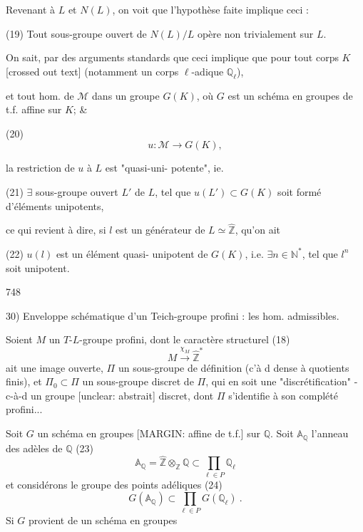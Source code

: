 Revenant à $L$ et $N(L)$, on voit
que l'hypothèse faite implique ceci :

(19) Tout sous-groupe ouvert de $N(L)/L$
opère non trivialement sur $L$.

On sait, par des arguments
standards que ceci implique que
pour tout corps $K$ [crossed out text]
(notamment un corps $\ell$-adique $\mathbb{Q}_\ell$),

\newpage


et tout hom. de $\mathcal{M}$ dans un groupe
$G(K)$, où $G$ est un schéma en
groupes de t.f. affine sur $K$; &

(20) $$u: \mathcal{M} \longrightarrow G(K),$$

la restriction de $u$ à $L$ est "quasi-uni-
potente", ie.

(21) $\exists$ sous-groupe ouvert $L'$ de $L$, tel que
$u(L') \subset G(K)$ soit formé d'éléments
unipotents,

ce qui revient à dire, si $l$ est un
générateur de $L \simeq \hat{\mathbb{Z}}$, qu'on ait

(22) $u(l)$ est un élément quasi-
unipotent de $G(K)$, i.e. $\exists n \in \mathbb{N}^*$,
tel que $l^n$ soit unipotent.

\newpage


748

30) Enveloppe schématique d'un Teich-groupe profini : les hom. admissibles.

Soient $M$ un $T$-$L$-groupe profini, dont le caractère structurel (18)
$$M \xrightarrow{\chi_M} \hat{\mathbb{Z}}^*$$
ait une image ouverte, $\Pi$ un sous-groupe de définition (c'à d dense à quotients finis), et $\Pi_0 \subset \Pi$ un sous-groupe discret de $\Pi$, qui en soit une "discrétification" - c-à-d un groupe [unclear: abstrait] discret, dont $\Pi$ s'identifie à son complété profini...

Soit $G$ un schéma en groupes [MARGIN: affine de t.f.] sur $\mathbb{Q}$. Soit $\mathbb{A}_\mathbb{Q}$ l'anneau des adèles de $\mathbb{Q}$
(23)
$$\mathbb{A}_\mathbb{Q} = \hat{\mathbb{Z}} \otimes_\mathbb{Z} \mathbb{Q} \subset \prod_{\ell \in P} \mathbb{Q}_\ell$$
et considérons le groupe des points adéliques
(24)
$$G(\mathbb{A}_\mathbb{Q}) \subset \prod_{\ell \in P} G(\mathbb{Q}_\ell) \ .$$
Si $G$ provient de un schéma en groupes

\newpage


